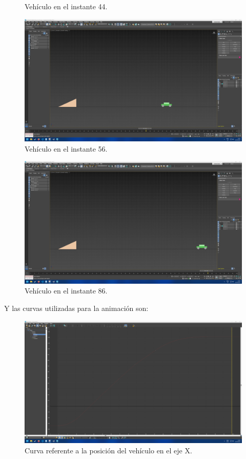 \documentclass{article}
\begin{document}
{\begin{figure}[H]
    \caption{Vehículo en el instante 44.}
 \end{figure}
 \begin{figure}[H]
    \centering
    \includegraphics[width=\textwidth]{imagenes/Ejercicio2/keyframes/56.png}
    \caption{Vehículo en el instante 56.}
 \end{figure}
 \begin{figure}[H]
    \centering
    \includegraphics[width=\textwidth]{imagenes/Ejercicio2/keyframes/86.png}
    \caption{Vehículo en el instante 86.}
 \end{figure}


Y las curvas utilizadas para la animación son:
}
\begin{figure}[H]
    \centering
    \includegraphics[width=\textwidth]{imagenes/Ejercicio2/curvas/red.png}
    \caption{Curva referente a la posición del vehículo en el eje X.}
 \end{figure}
\end{document}
